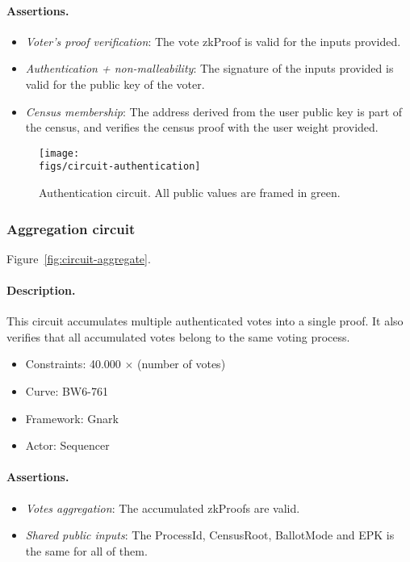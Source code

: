 \paragraph{Assertions.}

\begin{itemize}
	\item \emph{Voter's proof verification}: The vote zkProof is valid for the inputs provided.
	\item \emph{Authentication + non-malleability}: The signature of the inputs provided is valid for the public key of the voter.
	\item \emph{Census membership}: The address derived from the user public key is part of the census, and verifies the census proof with the user weight provided.
\end{itemize}

\begin{figure}[h]
	\centerline{\texttt{[image: \\figs/circuit-authentication]}}
	\caption{Authentication circuit. All public values are framed in green.}
	\label{fig:circuit-authentication}
\end{figure}

\subsubsection{Aggregation circuit}

Figure~\ref{fig:circuit-aggregate}.

\paragraph{Description.} This circuit accumulates multiple authenticated votes into a single proof. It also verifies that all accumulated votes belong to the same voting process.

\begin{itemize}
	\item Constraints: 40.000 $\times$ (number of votes)
	\item Curve: BW6-761
	\item Framework: Gnark
	\item Actor: Sequencer
\end{itemize}

\paragraph{Assertions.}

\begin{itemize}
	\item \emph{Votes aggregation}: The accumulated zkProofs are valid.
	\item \emph{Shared public inputs}: The ProcessId, CensusRoot, BallotMode and EPK is the same for all of them.
\end{itemize}

